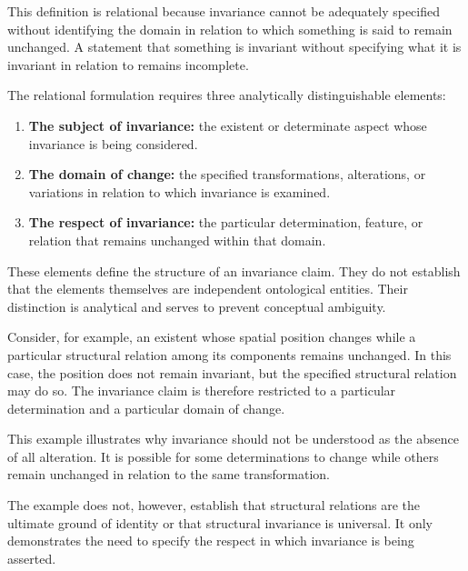 This definition is relational because invariance cannot
be adequately specified without identifying the domain
in relation to which something is said to remain unchanged.
A statement that something is invariant without specifying
what it is invariant in relation to remains incomplete.

The relational formulation requires three analytically
distinguishable elements:

\begin{enumerate}
    \item \textbf{The subject of invariance:} the existent
    or determinate aspect whose invariance is being
    considered.

    \item \textbf{The domain of change:} the specified
    transformations, alterations, or variations in relation
    to which invariance is examined.

    \item \textbf{The respect of invariance:} the particular
    determination, feature, or relation that remains
    unchanged within that domain.
\end{enumerate}

These elements define the structure of an invariance claim.
They do not establish that the elements themselves are
independent ontological entities. Their distinction is
analytical and serves to prevent conceptual ambiguity.

Consider, for example, an existent whose spatial position
changes while a particular structural relation among its
components remains unchanged. In this case, the position
does not remain invariant, but the specified structural
relation may do so. The invariance claim is therefore
restricted to a particular determination and a particular
domain of change.

This example illustrates why invariance should not be
understood as the absence of all alteration. It is possible
for some determinations to change while others remain
unchanged in relation to the same transformation.

The example does not, however, establish that structural
relations are the ultimate ground of identity or that
structural invariance is universal. It only demonstrates
the need to specify the respect in which invariance is
being asserted.


